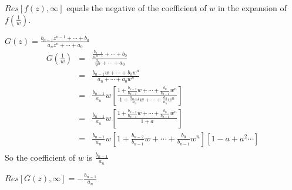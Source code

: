 \documentclass[letterpaper,12pt,fleqn]{article}
\begin{document}
\begin{theorem}
  $Res[f(z),\infty]$ equals the negative of the coefficient of $w$ in the
  expansion of $f(\frac{1}{w})$.
\end{theorem}

\begin{example}
  $G(z)=\frac{b_{n-1}z^{n-1}+\cdots+b_0}{a_nz^n+\cdots+a_0}$
  \begin{eqnarray*}
    G\left(\frac{1}{w}\right) &=& \frac{\frac{b_{n-1}}{w^{n-1}}+\cdots+b_0}
    {\frac{a_n}{w^n}+\cdots+a_0} \\
    &=& \frac{b_{n-1}w+\cdots+b_0w^n}{a_n+\cdots+a_0w^n} \\
    &=& \frac{b_{n-1}}{a_n}w\left[\frac{1+\frac{b_{n-2}}{b_{n-1}}w+\cdots+
        \frac{b_0}{b_{n-1}}w^n}
      {1+\frac{a_{n-1}}{a_n}w+\cdots+\frac{a_0}{a_n}w^n}\right] \\
    &=& \frac{b_{n-1}}{a_n}w\left[\frac{1+\frac{b_{n-2}}{b_{n-1}}w+\cdots+
        \frac{b_0}{b_{n-1}}w^n}{1+a}\right] \\
    &=& \frac{b_{n-1}}{a_n}w\left[1+\frac{b_{n-2}}{b_{n-1}}w+\cdots+
      \frac{b_0}{b_{n-1}}w^n\right]\left[1-a+a^2\cdots\right] \\
  \end{eqnarray*}
  So the coefficient of $w$ is $\frac{b_{n-1}}{a_n}$

  $Res[G(z),\infty]=-\frac{b_{n-1}}{a_n}$
\end{example}
\end{document}

